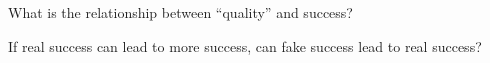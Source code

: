 \documentclass[aspectratio=169]{beamer}
\begin{document}
\begin{frame}

What is the relationship between ``quality'' and success?

\end{frame}
\begin{frame}

\vspace{0.0in}
\setcounter{subfigure}{0}
\begin{figure}
  \centering
  \hspace{0in}
\end{figure}
 
\end{frame}
%
%
% 
%
%
\begin{frame}

If real success can lead to more success, can fake success lead to real success?


\end{frame}
\end{document}
